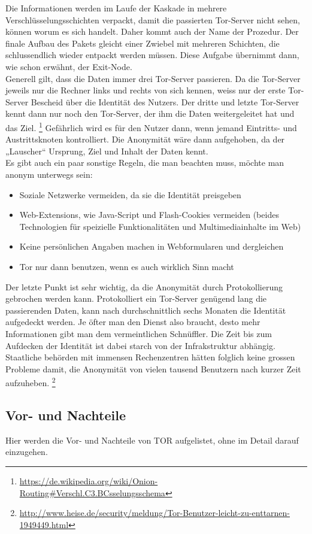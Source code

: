 Die Informationen werden im Laufe der Kaskade in mehrere Verschlüsselungsschichten verpackt, damit die passierten Tor-Server nicht sehen, können worum es sich handelt. Daher kommt auch der Name der Prozedur. Der finale Aufbau des Pakets gleicht einer Zwiebel mit mehreren Schichten, die  schlussendlich wieder entpackt werden müssen. Diese Aufgabe übernimmt dann, wie schon erwähnt, der Exit-Node.
\\
Generell gilt, dass die Daten immer drei Tor-Server passieren. Da die Tor-Server jeweils nur die Rechner links und rechts von sich kennen, weiss nur der erste Tor-Server Bescheid über die Identität des Nutzers. Der dritte und letzte Tor-Server kennt dann nur noch den Tor-Server, der ihm die Daten weitergeleitet hat und das Ziel.
\footnote{\url{https://de.wikipedia.org/wiki/Onion-Routing\#Verschl.C3.BCsselungsschema}} 
Gefährlich wird es für den Nutzer dann, wenn jemand Eintritts- und Austrittsknoten kontrolliert. Die Anonymität wäre dann aufgehoben, da der „Lauscher“ Ursprung, Ziel und Inhalt der Daten kennt.
\\
Es gibt auch ein paar sonstige Regeln, die man beachten muss, möchte man anonym unterwegs sein:
\begin{itemize}
\item Soziale Netzwerke vermeiden, da sie die Identität preisgeben
\item Web-Extensions, wie Java-Script und Flash-Cookies vermeiden (beides Technologien für speizielle Funktionalitäten und Multimediainhalte im Web)
\item Keine persönlichen Angaben machen in Webformularen und dergleichen
\item Tor nur dann benutzen, wenn es auch wirklich Sinn macht
\end{itemize}

Der letzte Punkt ist sehr wichtig, da die Anonymität durch Protokollierung gebrochen werden kann. Protokolliert ein Tor-Server genügend lang die passierenden Daten, kann nach durchschnittlich sechs Monaten die Identität aufgedeckt werden. Je öfter man den Dienst also braucht, desto mehr Informationen gibt man dem vermeintlichen Schnüffler. Die Zeit bis zum Aufdecken der Identität ist dabei starch von der Infrakstruktur abhängig. Staatliche behörden mit immensen Rechenzentren hätten folglich keine grossen Probleme damit, die Anonymität von vielen tausend Benutzern nach kurzer Zeit aufzuheben.
\footnote{\url{http://www.heise.de/security/meldung/Tor-Benutzer-leicht-zu-enttarnen-1949449.html}}

\subsection{Vor- und Nachteile}
Hier werden die Vor- und Nachteile von TOR aufgelistet, ohne im Detail darauf einzugehen.

